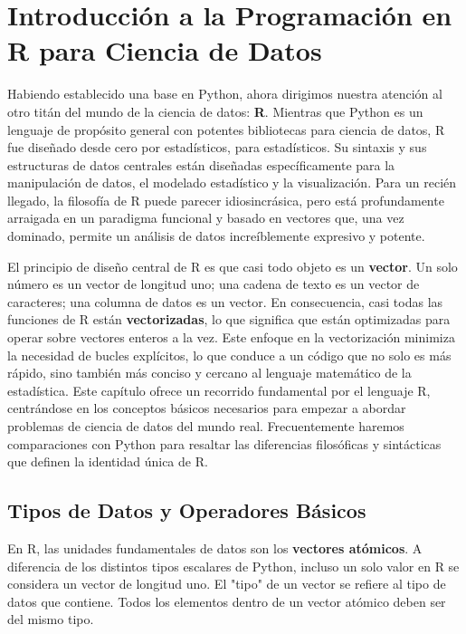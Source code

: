 \chapter{Introducción a la Programación en R para Ciencia de Datos}
\label{chap:r_intro}

Habiendo establecido una base en Python, ahora dirigimos nuestra atención al otro titán del mundo de la ciencia de datos: \textbf{R}. Mientras que Python es un lenguaje de propósito general con potentes bibliotecas para ciencia de datos, R fue diseñado desde cero por estadísticos, para estadísticos. Su sintaxis y sus estructuras de datos centrales están diseñadas específicamente para la manipulación de datos, el modelado estadístico y la visualización. Para un recién llegado, la filosofía de R puede parecer idiosincrásica, pero está profundamente arraigada en un paradigma funcional y basado en vectores que, una vez dominado, permite un análisis de datos increíblemente expresivo y potente.

El principio de diseño central de R es que casi todo objeto es un \textbf{vector}. Un solo número es un vector de longitud uno; una cadena de texto es un vector de caracteres; una columna de datos es un vector. En consecuencia, casi todas las funciones de R están \textbf{vectorizadas}, lo que significa que están optimizadas para operar sobre vectores enteros a la vez. Este enfoque en la vectorización minimiza la necesidad de bucles explícitos, lo que conduce a un código que no solo es más rápido, sino también más conciso y cercano al lenguaje matemático de la estadística. Este capítulo ofrece un recorrido fundamental por el lenguaje R, centrándose en los conceptos básicos necesarios para empezar a abordar problemas de ciencia de datos del mundo real. Frecuentemente haremos comparaciones con Python para resaltar las diferencias filosóficas y sintácticas que definen la identidad única de R.

\section{Tipos de Datos y Operadores Básicos}
\label{sec:r_data_types}
En R, las unidades fundamentales de datos son los \textbf{vectores atómicos}. A diferencia de los distintos tipos escalares de Python, incluso un solo valor en R se considera un vector de longitud uno. El "tipo" de un vector se refiere al tipo de datos que contiene. Todos los elementos dentro de un vector atómico deben ser del mismo tipo.

